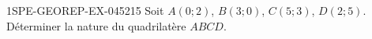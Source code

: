\begin{exercice}{1SPE-GEOREP-EX-045}{2}{15}
Soit $A(0 ; 2)$, $B(3 ; 0)$, $C(5 ; 3)$, $D(2 ; 5)$. Déterminer la nature du quadrilatère $ABCD$.
\end{exercice}
